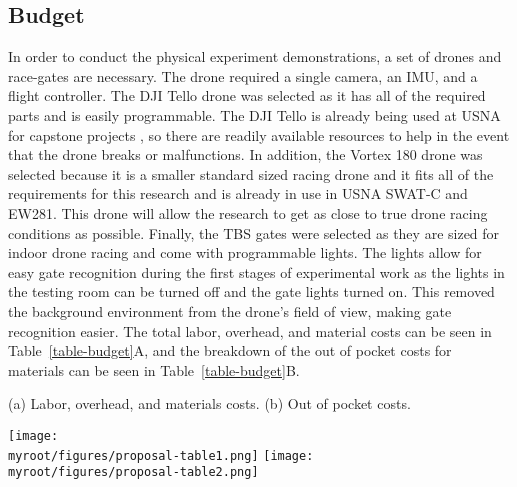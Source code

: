 \documentclass[onecolumn,10pt]{IEEEtran}
\newcommand{\myroot}{../}
\begin{document}
\subsection{Budget}
In order to conduct the physical experiment demonstrations, a set of drones and race-gates are necessary. The drone required a single camera, an IMU, and a flight controller. The DJI Tello drone was selected as it has all of the required parts and is easily programmable. The DJI Tello is already being used at USNA for capstone projects \cite{cuniff2019}, so there are readily available resources to help in the event that the drone breaks or malfunctions. In addition, the Vortex 180 drone was selected because it is a smaller standard sized racing drone and it fits all of the requirements for this research and is already in use in USNA SWAT-C and EW281. This drone will allow the research to get as close to true drone racing conditions as possible. Finally, the TBS gates were selected as they are sized for indoor drone racing and come with programmable lights. The lights allow for easy gate recognition during the first stages of experimental work as the lights in the testing room can be turned off and the gate lights turned on. This removed the background environment from the drone’s field of view, making gate recognition easier. The total labor, overhead, and material costs can be seen in Table~\ref{table-budget}A, and the breakdown of the out of pocket costs for materials can be seen in Table~\ref{table-budget}B.
\begin{table}[hbp]
\caption{(a) Labor, overhead, and materials costs. (b) Out of pocket costs.}
\label{table-budget}
\begin{center}
\texttt{[image: \\myroot/figures/proposal-table1.png]}
\texttt{[image: \\myroot/figures/proposal-table2.png]}
\end{center}
\end{table}
\end{document}
